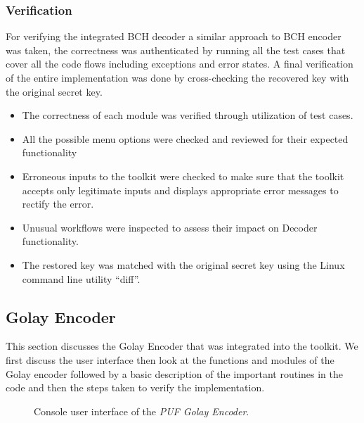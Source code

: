 	\subsubsection{Verification}
	For verifying the integrated BCH decoder a similar approach to BCH encoder was taken, the correctness was authenticated by running all the test cases that cover all the code flows including exceptions and error states. A final verification of the entire implementation was done by cross-checking the recovered key with the original secret key.


	\begin{itemize}
		\item The correctness of each module was verified through utilization of test cases.
		\item All the possible menu options were checked and reviewed for their expected functionality
		\item Erroneous inputs to the toolkit were checked to make sure that the toolkit accepts only legitimate inputs and displays appropriate error messages to rectify the error.
		\item Unusual workflows were inspected to assess their impact on Decoder functionality.
		\item The restored key was matched with the original secret key using the Linux command line utility ``diff''.
	\end{itemize}

	\subsection{Golay Encoder}

	This section discusses the Golay Encoder that was integrated into the toolkit. We first discuss the user interface then look at the functions and modules of the Golay encoder followed by a basic description of the important routines in the code and then the steps taken to verify the implementation.\\
	\begin{figure}[h!]
	\centering
	\caption{Console user interface of the \emph{PUF Golay Encoder}.}
	\label{img:golay_enc_ui}
	\end{figure}

